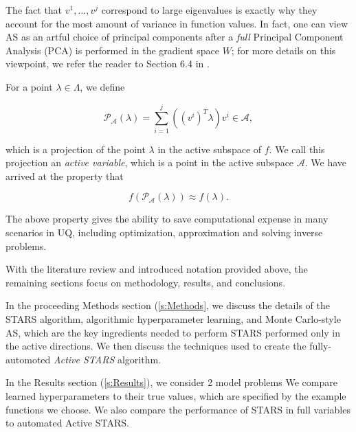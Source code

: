 \documentclass{amsart}
\newcommand{\A}{\mathcal{A}}
\begin{document}


The fact that $v^1,\ldots,v^{j}$ correspond to large %
eigenvalues is exactly why they account for the most amount of variance in function values. In fact, one can view AS as an artful choice of principal components after a \textit{full} Principal Component Analysis (PCA) is performed in the gradient space $W$; for more details on this viewpoint, we refer the reader to Section 6.4 in \cite{Russi}.

For a point $\lambda \in \Lambda$, we define

\begin{equation} \label{eq:7}
  \mathcal{P}_\A(\lambda)=\sum_{i=1}^{j}\left( ({v^i})^T \lambda\right)v^i \in \A, 
\end{equation}

\noindent which is a projection of the point $\lambda$ in the active subspace of $f$. We call this projection an \textit{active variable}, which is a point in the active subspace $\A$. We have arrived at the property that 

\begin{equation} \label{eq:8}
f\left(\mathcal{P}_\A(\lambda)\right) \approx f(\lambda).
\end{equation}

The above property  gives the ability to save computational expense in many scenarios in UQ, 
including optimization, approximation %
and solving inverse problems. 


With the literature review and introduced notation provided above, the remaining sections focus on methodology, results, and conclusions. 

In the proceeding Methods section (\ref{s:Methods}, we %
discuss the details of the STARS algorithm, algorithmic hyperparameter learning, and Monte Carlo-style AS, which are the key ingredients needed to perform STARS performed only in the active directions. We then discuss the techniques used to create the fully-automoted \textit{Active STARS} algorithm.

In the Results section (\ref{s:Results}), we consider 2 model problems %
We compare learned hyperparameters to their true values, which are specified by the example functions we choose. We also compare the performance of STARS in full variables to automated Active STARS.
\end{document}
